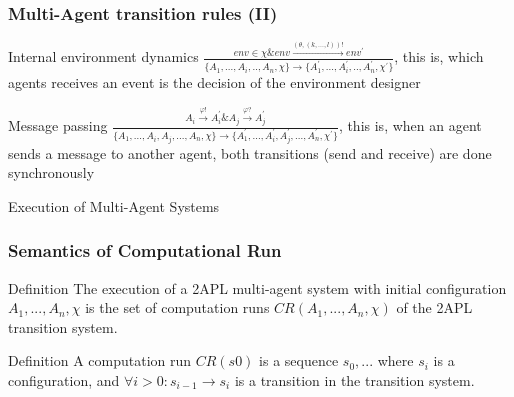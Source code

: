 \documentclass{beamer}
\begin{document}

\begin{frame}
\frametitle{Multi-Agent transition rules (II)}

\begin{block}{Internal environment dynamics}
	$\frac{ env \in \chi \& env \xrightarrow{(\theta,(k,...,l))!} env^\prime}{\{A_1,...,A_i,..,A_n,\chi\} \rightarrow \{A^\prime_1,...,A^{\prime}_i,..,A^\prime_n,\chi^\prime\} }$, this is, which agents receives an event is the decision of the environment designer
\end{block}

\begin{block}{Message passing}
 $ \frac{A_i \xrightarrow[]{\varphi!} A^\prime_i \& A_j \xrightarrow[]{\varphi?} A^\prime_j}{\{A_1,...,A_i,A_j,...,A_n,\chi\} \rightarrow \{A^\prime_1,...,A^{\prime}_i,A^\prime_j,...,A^\prime_n,\chi^\prime\} } $, this is, when an agent sends a message to another agent, both transitions (send and receive) are done synchronously
\end{block}

\end{frame}


%


\begin{frame}
\Huge{\centerline{Execution of Multi-Agent Systems}}
\end{frame}


\begin{frame}
\frametitle{Semantics of Computational Run }
\begin{block}{Definition}
	The execution of a 2APL multi-agent system with initial configuration $A_1,...,A_n, \chi$ is the set of computation runs $CR(A_1,...,A_n, \chi)$ of the 2APL transition system.
\end{block}
\begin{block}{Definition}
	A computation run $CR(s0)$ is a sequence $s_0,...$ where $s_i$ is a
configuration, and $ \forall{i>0} : s_{i−1} \rightarrow s_i$ is a transition in the transition system.
\end{block}

\end{frame}
\end{document}
